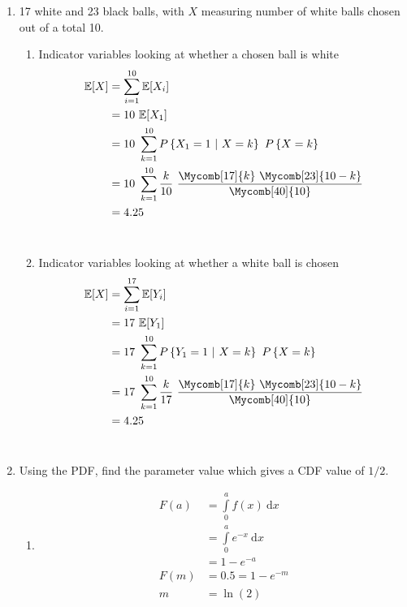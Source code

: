 \begin{enumerate}
\begin{enumerate}
		\end{enumerate}
	
	
	\item 17 white and 23 black balls, with $ X $ measuring number of white balls chosen out of a total 10. \\
	
		\begin{enumerate}
			
			\item Indicator variables looking at whether a chosen ball is white
			\begin{align}
				\mathbb{E}[X] &= \sum\limits_{i = 1}^{10} \mathbb{E}[X_i] \nonumber \\
				&= 10\ \mathbb{E}[X_1] \nonumber \\
				&= 10\ \sum\limits_{k = 1}^{10} P \left\{ X_1 = 1\ |\ X = k \right\} \ P\left\{X = k\right\} \nonumber \\
				&= 10\ \sum\limits_{k = 1}^{10} \frac{k}{10} \ \frac{\Mycomb[17]{k}\ \Mycomb[23]{10-k}}{\Mycomb[40]{10}} \nonumber \\
				&= 4.25
			\end{align} \\
			
			\item Indicator variables looking at whether a white ball is chosen
			\begin{align}
				\mathbb{E}[X] &= \sum\limits_{i = 1}^{17} \mathbb{E}[Y_i] \nonumber \\
				&= 17\ \mathbb{E}[Y_1] \nonumber \\
				&= 17\ \sum\limits_{k = 1}^{10} P \left\{ Y_1 = 1\ |\ X = k \right\} \ P\left\{X = k\right\} \nonumber \\
				&= 17\ \sum\limits_{k = 1}^{10} \frac{k}{17} \ \frac{\Mycomb[17]{k}\ \Mycomb[23]{10-k}}{\Mycomb[40]{10}} \nonumber \\
				&= 4.25
			\end{align} \\
			
		\end{enumerate}
	
	
	\item Using the PDF, find the parameter value which gives a CDF value of $ 1/2 $. \\
	
		\begin{enumerate}
			
			\item 	\begin{align}
				F(a) &= \int\limits_{0}^{a} f(x)\ \mathrm{d}x \nonumber \\
				&= \int\limits_{0}^{a} e^{-x}\ \mathrm{d}x \nonumber \\
				&= 1 - e^{-a} \nonumber \\
				F(m) &= 0.5 = 1 - e^{-m} \nonumber \\
				m &= \ln (2)
			\end{align} \\
			

\end{enumerate}
\end{enumerate}
